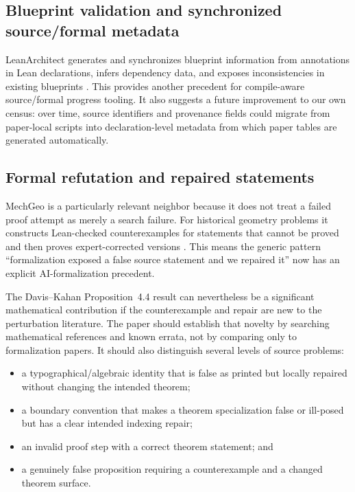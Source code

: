 \documentclass[11pt]{article}
\begin{document}
\subsection{Blueprint validation and synchronized source/formal metadata}

LeanArchitect generates and synchronizes blueprint information from annotations
in Lean declarations, infers dependency data, and exposes inconsistencies in
existing blueprints \citep{zhu2026leanarchitect}.  This provides another
precedent for compile-aware source/formal progress tooling.  It also suggests a
future improvement to our own census: over time, source identifiers and
provenance fields could migrate from paper-local scripts into declaration-level
metadata from which paper tables are generated automatically.

\subsection{Formal refutation and repaired statements}

MechGeo is a particularly relevant neighbor because it does not treat a failed
proof attempt as merely a search failure.  For historical geometry problems it
constructs Lean-checked counterexamples for statements that cannot be proved and
then proves expert-corrected versions \citep{shen2026mechgeo}.  This means the
generic pattern ``formalization exposed a false source statement and we repaired
it'' now has an explicit AI-formalization precedent.

The Davis--Kahan Proposition~4.4 result can nevertheless be a significant
mathematical contribution if the counterexample and repair are new to the
perturbation literature.  The paper should establish that novelty by searching
mathematical references and known errata, not by comparing only to formalization
papers.  It should also distinguish several levels of source problems:

\begin{itemize}
  \item a typographical/algebraic identity that is false as printed but locally
        repaired without changing the intended theorem;
  \item a boundary convention that makes a theorem specialization false or
        ill-posed but has a clear intended indexing repair;
  \item an invalid proof step with a correct theorem statement; and
  \item a genuinely false proposition requiring a counterexample and a changed
        theorem surface.
\end{itemize}
\end{document}
